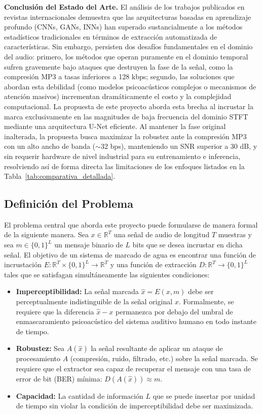 \textbf{Conclusión del Estado del Arte.} El análisis de los trabajos publicados en revistas internacionales demuestra que las arquitecturas basadas en aprendizaje profundo (CNNs, GANs, INNs) han superado sustancialmente a los métodos estadísticos tradicionales en términos de extracción automatizada de características. Sin embargo, persisten dos desafíos fundamentales en el dominio del audio: primero, los métodos que operan puramente en el dominio temporal sufren gravemente bajo ataques que destruyen la fase de la señal, como la compresión MP3 a tasas inferiores a 128 kbps; segundo, las soluciones que abordan esta debilidad (como modelos psicoacústicos complejos o mecanismos de atención masivos) incrementan dramáticamente el costo y la complejidad computacional. La propuesta de este proyecto aborda esta brecha al incrustar la marca exclusivamente en las magnitudes de baja frecuencia del dominio STFT mediante una arquitectura U-Net eficiente. Al mantener la fase original inalterada, la propuesta busca maximizar la robustez ante la compresión MP3 con un alto ancho de banda ($\sim$32 bps), manteniendo un SNR superior a 30 dB, y sin requerir hardware de nivel industrial para su entrenamiento e inferencia, resolviendo así de forma directa las limitaciones de los enfoques listados en la Tabla~\ref{tab:comparativa_detallada}.

\subsection{Definición del Problema}
\label{sec:problema}

El problema central que aborda este proyecto puede formularse de manera formal de la siguiente manera. Sea $x \in \mathbb{R}^T$ una señal de audio de longitud $T$ muestras y sea $m \in \{0,1\}^L$ un mensaje binario de $L$ bits que se desea incrustar en dicha señal. El objetivo de un sistema de marcado de agua es encontrar una función de incrustación $E: \mathbb{R}^T \times \{0,1\}^L \rightarrow \mathbb{R}^T$ y una función de extracción $D: \mathbb{R}^T \rightarrow \{0,1\}^L$ tales que se satisfagan simultáneamente las siguientes condiciones:

\begin{itemize}
    \item \textbf{Imperceptibilidad:} La señal marcada $\hat{x} = E(x, m)$ debe ser perceptualmente indistinguible de la señal original $x$. Formalmente, se requiere que la diferencia $\hat{x} - x$ permanezca por debajo del umbral de enmascaramiento psicoacústico del sistema auditivo humano en todo instante de tiempo.

    \item \textbf{Robustez:} Sea $A(\hat{x})$ la señal resultante de aplicar un ataque de procesamiento $A$ (compresión, ruido, filtrado, etc.) sobre la señal marcada. Se requiere que el extractor sea capaz de recuperar el mensaje con una tasa de error de bit (BER) mínima: $D(A(\hat{x})) \approx m$.

    \item \textbf{Capacidad:} La cantidad de información $L$ que se puede insertar por unidad de tiempo sin violar la condición de imperceptibilidad debe ser maximizada.
\end{itemize}


